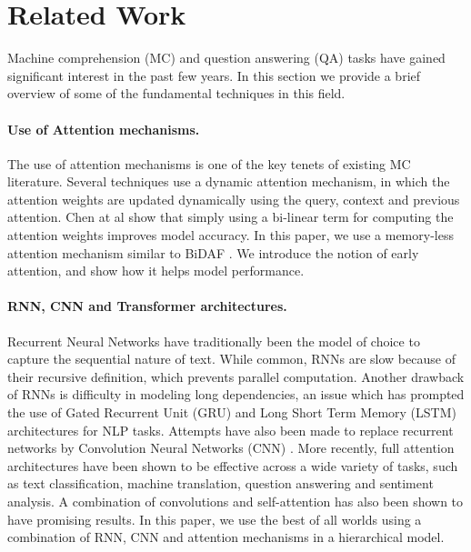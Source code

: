 \section{Related Work}
\label{sec:relatedwork}

Machine comprehension (MC) and question answering (QA) tasks have gained significant interest in the past few years. In this section we provide a brief overview of some of the fundamental techniques in this field.

\paragraph{Use of Attention mechanisms.} The use of attention mechanisms is one of the key tenets of existing MC literature. Several techniques \cite{bahdanau2014neural, hermann2015teaching} use a dynamic attention mechanism, in which the attention weights are updated dynamically using the query, context and previous attention. Chen at al \cite{chen2016thorough} show that simply using a bi-linear term for computing the attention weights improves model accuracy. In this paper, we use a memory-less attention mechanism similar to BiDAF \cite{seo2016bidirectional}. We introduce the notion of early attention, and show how it helps model performance.

\paragraph{RNN, CNN and Transformer architectures.} Recurrent Neural Networks have traditionally been the model of choice to capture the sequential nature of text. While common, RNNs are slow because of their recursive definition, which prevents parallel computation. Another drawback of RNNs is difficulty in modeling long dependencies, an issue which has prompted the use of Gated Recurrent Unit (GRU) and Long Short Term Memory (LSTM) architectures for NLP tasks. Attempts have also been made to replace recurrent networks by Convolution Neural Networks (CNN) \cite{kim2014convolutional}. More recently, full attention architectures \cite{vaswani2017attention} have been shown to be effective across a wide variety of tasks, such as text classification, machine translation, question answering and sentiment analysis. A combination of convolutions and self-attention \cite{yu2018qanet} has also been shown to have promising results. In this paper, we use the best of all worlds using a combination of RNN, CNN and attention mechanisms in a hierarchical model.

